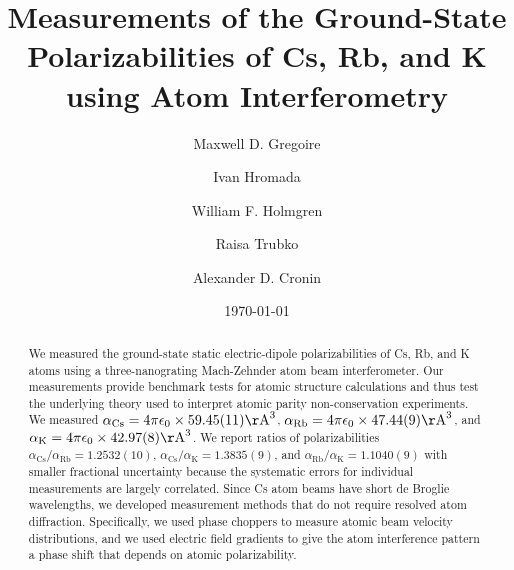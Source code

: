 \documentclass[twocolumn,prl,showpacs,superscriptaddress]{revtex4-1}   %
\newcommand{\ak}{\alpha_{\textrm{K}}}
\newcommand{\arb}{\alpha_{\textrm{Rb}}}
\newcommand{\acs}{\alpha_{\textrm{Cs}}}
\newcommand{\polKSysOnly}{42.97(8)}
\newcommand{\polRbSysOnly}{47.44(9)}
\newcommand{\polCsSysOnly}{59.45(11)}
\newcommand{\ratRbK}{1.1040(9)}
\newcommand{\ratCsK}{1.3835(9)}
\newcommand{\ratCsRb}{1.2532(10)}
\newcommand{\AAA}{\mathrm{\AA}}
\begin{document}
\title{Measurements of the Ground-State Polarizabilities of Cs, Rb, and K using Atom Interferometry}

\author{Maxwell D. Gregoire}
\author{Ivan Hromada}
\author{William F. Holmgren}
\author{Raisa Trubko}
\author{Alexander D. Cronin}

\date{\today}





\begin{abstract}
We measured the ground-state static electric-dipole polarizabilities of Cs, Rb, and K atoms using a three-nanograting Mach-Zehnder atom beam interferometer. Our measurements provide benchmark tests for atomic structure calculations and thus test the underlying theory used to interpret atomic parity non-conservation experiments. We measured $\acs = 4\pi\epsilon_0 \times \polCsSysOnly \AAA^3$, $\arb = 4\pi\epsilon_0 \times \polRbSysOnly \AAA^3$, and $\ak = 4\pi\epsilon_0 \times \polKSysOnly \AAA^3$. We report ratios of polarizabilities $\acs/\arb = \ratCsRb$, $\acs/\ak = \ratCsK$, and $\arb/\ak = \ratRbK$ with smaller fractional uncertainty because the systematic errors for individual measurements are largely correlated. 
Since Cs atom beams have short de Broglie wavelengths, we developed measurement methods that do not require resolved atom diffraction.
Specifically, we used phase choppers to measure atomic beam velocity distributions, and we used electric field gradients to give the atom interference pattern a phase shift that depends on atomic polarizability.
\end{abstract}





\maketitle
\end{document}

